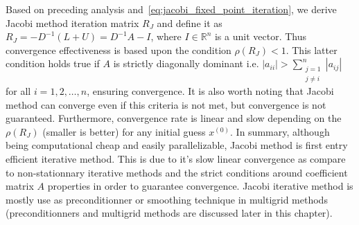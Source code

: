 Based on preceding analysis and~\ref{eq:jacobi_fixed_point_iteration}, we derive Jacobi method iteration matrix $R_J$ and define it as $R_J=-D^{-1}(L+U)=D^{-1}A - I$, where $I \in \mathbb{R}^{n}$ is a unit vector. Thus convergence effectiveness is based upon the condition $\rho(R_J) < 1$. This latter condition holds true if $A$ is strictly diagonally dominant i.e. $|a_{ii}| > \sum_{\substack{j=1 \\ j \ne i}}^{n} |a_{ij}|$ for all $i=1,2,\ldots,n$, ensuring convergence. It is also worth noting that Jacobi method can converge even if this criteria is not met, but convergence is not guaranteed. Furthermore, convergence rate is linear and slow depending on the $\rho(R_J)$ (smaller is better) for any initial guess $x^{(0)}$. In summary, although being computational cheap and easily parallelizable, Jacobi method is first entry efficient iterative method. This is due to it's slow linear convergence as compare to non-stationnary iterative methods and the strict conditions around coefficient matrix $A$ properties in order to guarantee convergence. Jacobi iterative method is mostly use as preconditionner or smoothing technique in multigrid methods (preconditionners and multigrid methods are discussed later in this chapter).







